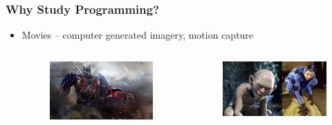 \documentclass{beamer}
\begin{document}
\begin{frame}
\begin{itemize}
\begin{columns}
\begin{figure}
            \end{figure}
        \end{columns}
    \end{itemize}
\end{frame}

\begin{frame}
    \frametitle{Why Study Programming?}
    \begin{itemize}
        \item Movies -- computer generated imagery, motion capture
        \begin{columns}
            \begin{figure}
                \centering
                \includegraphics[scale=0.08]{cgi}
            \end{figure}
            \begin{figure}
                \centering
                \includegraphics[scale=0.042]{motion_capture}
            \end{figure}
        \end{columns}
    \end{itemize}
\end{frame}
\end{document}
